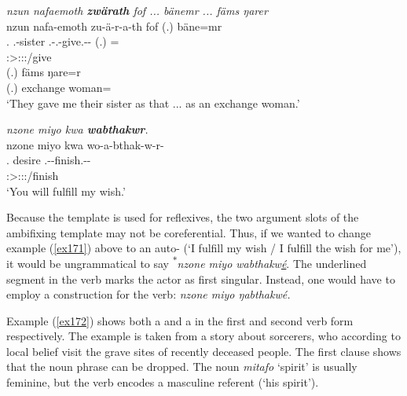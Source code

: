 \begin{exe}
	\ex \emph{nzun nafaemoth \textbf{zwärath} fof ... bänemr ... fäms ŋarer}\\
	\glll nzun nafa-emoth zu-ä-r-a-th fof (.) bäne=mr\\
	\Fsg.\Dat{} \Third.\Poss-sister \Fsg.\Gam-\Vc.\Ndu-give.\Rs-\Pst-\Stnsg{} \Emph{} (.) \Recog=\Purp{}\\
	{} {} \footnotesize{\Stpl:\Sbj>\Fsg:\Io:\Pst:\Pfv/give} {} {} {} {} {}\\
	\sn
	\gll (.) fäms ŋare=r\\
	(.) exchange woman=\Purp\\
	\trans `They gave me their sister as that ... as an exchange woman.'\\ 
	\label{ex173}
\end{exe}
\begin{exe}
	\ex \emph{nzone miyo kwa \textbf{wabthakwr}.}\\
	\glll nzone miyo kwa wo-a-bthak-w-r-\Zero{}\\
	\Fsg.\Poss{} desire \Fut{} \Fsg.\Alph-\Vc-finish.\Ext-\Lk-\Stsg{}\\
	{} {} {} \footnotesize{\Stsg:\Sbj>\Fsg:\Io:\Nonpast:\Ipfv/finish}\\
	\trans `You will fulfill my wish.' 
	\label{ex171}
\end{exe}

Because the  template is used for reflexives, the two argument slots of the ambifixing template may not be coreferential. Thus, if we wanted to change example (\ref{ex171}) above to an auto- (`I fulfill my wish / I fulfill the wish for me'), it would be ungrammatical to say \textsuperscript{$\ast$}\emph{nzone miyo wabthakw\uline{é}}. The underlined segment in the verb marks the actor as first singular. Instead, one would have to employ a  construction for the verb: \emph{nzone miyo ŋabthakwé.}%

Example (\ref{ex172}) shows both a  and a  in the first and second verb form respectively. The example is taken from a story about sorcerers, who \textendash{} according to local belief \textendash{} visit the grave sites of recently deceased people. The first clause shows that the  noun phrase can be dropped. The noun \emph{mitafo} `spirit' is usually feminine, but the verb encodes a masculine referent (`his spirit').

